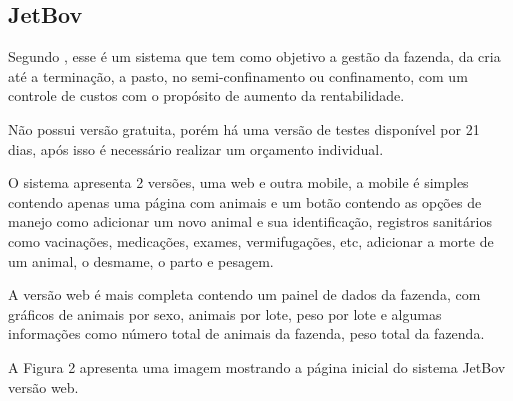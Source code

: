 \documentclass[12pt]{article}
\begin{document}
\begin{titlepage}
\begin{center}




\newpage


\subsection{JetBov}

Segundo , esse é um sistema que tem como objetivo a gestão da fazenda, da cria até a terminação, a pasto, no semi-confinamento ou confinamento, com um controle de custos com o propósito de aumento da rentabilidade. 

Não possui versão gratuita, porém há uma versão de testes disponível por 21 dias, após isso é necessário realizar um orçamento individual.

O sistema apresenta 2 versões, uma web e outra mobile, a mobile é simples contendo apenas uma página com animais e um botão contendo as opções de manejo como adicionar um novo animal e sua identificação, registros sanitários como vacinações, medicações, exames, vermifugações, etc, adicionar a morte de um animal, o desmame, o parto e pesagem.

A versão web é mais completa contendo um painel de dados da fazenda, com gráficos de animais por sexo, animais por lote, peso por lote e algumas informações como número total de animais da fazenda, peso total da fazenda. 

A Figura 2 apresenta uma imagem mostrando a página inicial do sistema JetBov versão web.


\end{center}
\end{titlepage}
\end{document}
